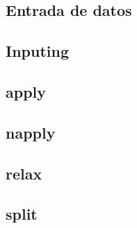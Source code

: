 \documentclass{beamer}
\begin{document}
\subsection{Entrada de datos}

\subsection{Inputing}

\subsection{apply}

\subsection{napply}

\subsection{relax}

\subsection{split}
\end{document}
